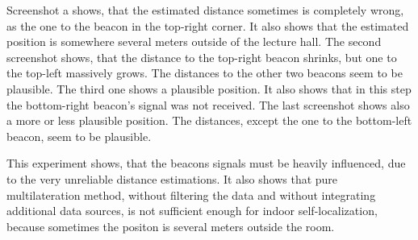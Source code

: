 Screenshot a shows, that the estimated distance sometimes is completely wrong, as the one to the beacon in the top-right corner.
It also shows that the estimated position is somewhere several meters outside of the lecture hall.
The second screenshot shows, that the distance to the top-right beacon shrinks, but one to the top-left massively grows. The distances to the other two beacons seem to be plausible.
The third one shows a plausible position. It also shows that in this step the bottom-right beacon's signal was not received.
The last screenshot shows also a more or less plausible position. The distances, except the one to the bottom-left beacon, seem to be plausible.

This experiment shows, that the beacons signals must be heavily influenced, due to the very unreliable distance estimations.
It also shows that pure multilateration method, without filtering the data and without integrating additional data sources, is not sufficient enough for indoor self-localization, because sometimes the positon is several meters outside the room.

